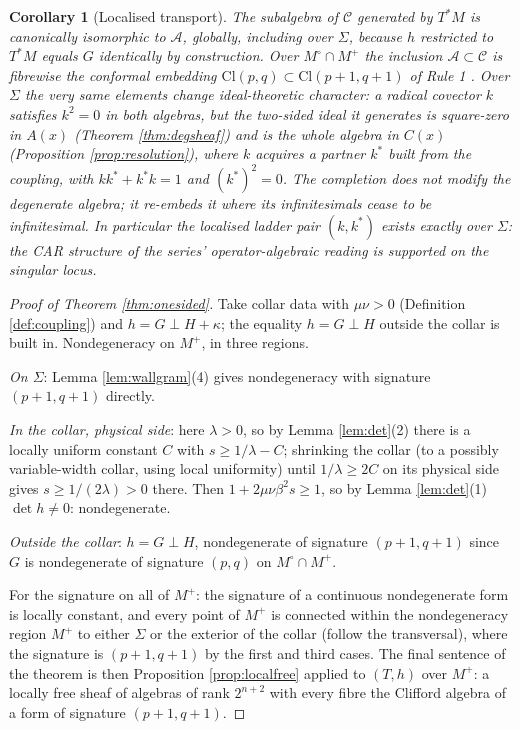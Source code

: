 \documentclass[11pt]{article}
\newtheorem{corollary}[theorem]{Corollary}
\theoremstyle{definition}
\newcommand{\Cl}{\mathrm{Cl}}
\newcommand{\shA}{\mathcal{A}}
\newcommand{\shC}{\mathcal{C}}
\newcommand{\Sig}{\Sigma}
\newcommand{\Mo}{M^{\circ}}
\newcommand{\Mp}{M^{+}}
\begin{document}
\begin{corollary}[Localised transport]\label{cor:localised}
The subalgebra of $\shC$ generated by $T^*M$ is canonically isomorphic to $\shA$, globally, including over $\Sig$, because $h$ restricted to $T^*M$ equals $G$ identically by construction. Over $\Mo \cap \Mp$ the inclusion $\shA \subset \shC$ is fibrewise the conformal embedding $\Cl(p,q) \subset \Cl(p{+}1,q{+}1)$ of Rule 1 \cite{ButlerT1}. Over $\Sig$ the very same elements change ideal-theoretic character: a radical covector $k$ satisfies $k^2 = 0$ in both algebras, but the two-sided ideal it generates is square-zero in $A(x)$ (Theorem \ref{thm:degsheaf}) and is the whole algebra in $C(x)$ (Proposition \ref{prop:resolution}), where $k$ acquires a partner $k^*$ built from the coupling, with $kk^* + k^*k = 1$ and $(k^*)^2 = 0$. The completion does not modify the degenerate algebra; it re-embeds it where its infinitesimals cease to be infinitesimal. In particular the localised ladder pair $(k, k^*)$ exists exactly over $\Sig$: the CAR structure of the series' operator-algebraic reading is supported on the singular locus.
\end{corollary}

\begin{proof}[Proof of Theorem \ref{thm:onesided}]
Take collar data with $\mu\nu > 0$ (Definition \ref{def:coupling}) and $h = G \perp H + \kappa$; the equality $h = G \perp H$ outside the collar is built in. Nondegeneracy on $\Mp$, in three regions.

\emph{On $\Sig$}: Lemma \ref{lem:wallgram}(4) gives nondegeneracy with signature $(p{+}1, q{+}1)$ directly.

\emph{In the collar, physical side}: here $\lambda > 0$, so by Lemma \ref{lem:det}(2) there is a locally uniform constant $C$ with $s \geq 1/\lambda - C$; shrinking the collar (to a possibly variable-width collar, using local uniformity) until $1/\lambda \geq 2C$ on its physical side gives $s \geq 1/(2\lambda) > 0$ there. Then $1 + 2\mu\nu\beta^2 s \geq 1$, so by Lemma \ref{lem:det}(1) $\det h \neq 0$: nondegenerate.

\emph{Outside the collar}: $h = G \perp H$, nondegenerate of signature $(p{+}1,q{+}1)$ since $G$ is nondegenerate of signature $(p,q)$ on $\Mo \cap \Mp$.

For the signature on all of $\Mp$: the signature of a continuous nondegenerate form is locally constant, and every point of $\Mp$ is connected within the nondegeneracy region $\Mp$ to either $\Sig$ or the exterior of the collar (follow the transversal), where the signature is $(p{+}1,q{+}1)$ by the first and third cases. The final sentence of the theorem is then Proposition \ref{prop:localfree} applied to $(T, h)$ over $\Mp$: a locally free sheaf of algebras of rank $2^{n+2}$ with every fibre the Clifford algebra of a form of signature $(p{+}1, q{+}1)$.
\end{proof}
\end{document}
